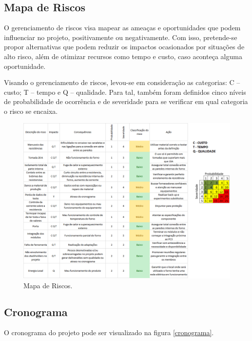 \subsection{Mapa de Riscos}

O gerenciamento de riscos visa mapear as ameaças e oportunidades que podem influenciar no projeto, positivamente ou negativamente. Com isso, pretende-se propor alternativas que podem reduzir os impactos ocasionados por situações de alto risco, além de otimizar recursos como tempo e custo, caso aconteça alguma oportunidade.

Visando o gerenciamento de riscos, levou-se em consideração as categorias: C – custo; T – tempo e Q – qualidade. Para tal, também foram definidos cinco níveis de probabilidade de ocorrência e de severidade para se verificar em qual categoria o risco se encaixa.

\begin{figure}[H]
	\centering
	\label{risco2}
	\includegraphics[keepaspectratio=true,scale=0.6]{figuras/riscos.png}
	\caption{Mapa de Riscos.}
\end{figure} 

\subsection{Cronograma}

O cronograma do projeto pode ser visualizado na figura \ref{cronograma}.


